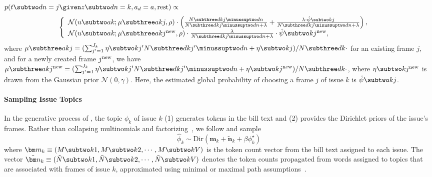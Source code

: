 $p(t \subtwo dn = j \given z \subtwo dn = k, a_d =
a, \mbox{rest}) \propto$
\begin{equation}
\left\{
  \begin{array}{ll}
    \mathcal{N}(u \subtwo ak; \mu \subthree akj, \rho) \cdot
     \left(\frac{N \subthree dkj \minussuptwo dn}{N \subthree dkj \minussuptwo dn + \lambda} +
        \frac{\lambda \cdot \hat{\psi} \subtwo kj}{N \subthree dkj \minussuptwo dn + \lambda }
        \right),
     & \\
     \mathcal{N}(u \subtwo ak; \mu \subthree ak{j^{\mbox{\scriptsize new}}}, \rho) \cdot
     \frac{\lambda}{N \subthree dkj \minussuptwo dn + \lambda} \cdot
        \hat{\psi} \subtwo k{j^{\mbox{\scriptsize new}}}

        ,
     &
  \end{array}
\right.
\label{eqn:c6_sample_t}
\end{equation}
where $\mu \subthree akj = (\sum_{j'=1}^{J_k} \eta \subtwo k{j'} N \subthree dk{j'} \minussuptwo dn
+ \eta \subtwo kj) /  N \subthree dk{\cdot}$ for an existing frame $j$, and for a newly created
frame $j^{\mbox{\scriptsize new}}$, we have $\mu \subthree ak{j^{\mbox{\scriptsize new}}} =
(\sum_{j'=1}^{J_k} \eta \subtwo k{j'} N \subthree dk{j'} \minussuptwo dn + \eta \subtwo
k{j^{\mbox{\scriptsize new}}}) /  N \subthree dk{\cdot}$, where $\eta \subtwo
k{j^{\mbox{\scriptsize new}}}$ is drawn from the Gaussian prior $\mathcal{N}(0, \gamma)$. Here, the
estimated global probability of choosing a frame $j$ of issue $k$ is $\hat{\psi} \subtwo kj$.


\paragraph{Sampling Issue Topics}

In the generative process of \name{}, the topic $\phi_k$ of issue $k$ (1)
generates tokens in the bill text and (2) provides the Dirichlet priors of the
issue's frames. Rather than collapsing multinomials and factorizing~\cite{hu-12:fttm},
we follow  and sample
\begin{equation}
  \hat{\phi}_k \sim \mbox{Dir} (\bm m_k + \tilde{\bm n}_k + \beta \phi_k^{\star})
  \label{eq:phi_samp}
\end{equation}
where $\bm m_k \equiv (M \subtwo k1, M \subtwo k2, \cdots, M \subtwo
kV)$ is the token count vector from the bill text assigned to each
issue. The vector $\tilde{\bm n}_k \equiv (\tilde{N} \subtwo k1,
\tilde{N} \subtwo k2, \cdots, \tilde{N} \subtwo kV)$ denotes the token
counts propagated from words assigned to topics that are associated
with frames of issue $k$, approximated using minimal or maximal path
assumptions~\cite{Cowans:PhD06,Wallach:PhD08}.

